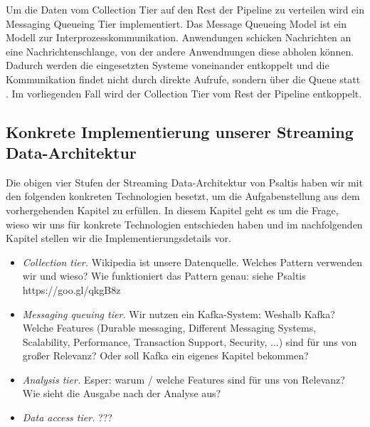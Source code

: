 Um die Daten vom Collection Tier auf den Rest der Pipeline zu verteilen wird ein Messaging Queueing Tier implementiert.
Das Message Queueing Model ist ein Modell zur Interprozesskommunikation. Anwendungen schicken
Nachrichten an eine Nachrichtenschlange, von der andere Anwendnungen diese abholen können\cite{gray2003interprocess}.
Dadurch werden die eingesetzten Systeme voneinander entkoppelt und die Kommunikation findet nicht durch direkte Aufrufe,
sondern über die Queue statt \cite{psaltis2017streaming}. Im vorliegenden Fall wird der Collection Tier vom Rest der Pipeline entkoppelt.


\subsection{Konkrete Implementierung unserer Streaming Data-Architektur}
Die obigen vier Stufen der Streaming Data-Architektur von Psaltis \cite{psaltis2017streaming}
haben wir mit den folgenden konkreten Technologien besetzt, um die Aufgabenstellung aus dem vorhergehenden Kapitel zu erfüllen.
In diesem Kapitel geht es um die Frage, wieso wir uns für konkrete Technologien entschieden haben und im nachfolgenden Kapitel
stellen wir die Implementierungsdetails vor.
\begin{itemize}
    \item \textit{Collection tier.} Wikipedia ist unsere Datenquelle.
    Welches Pattern verwenden wir und wieso? Wie funktioniert das Pattern genau: siehe Psaltis https://goo.gl/qkgB8z
    \item \textit{Messaging queuing tier.} Wir nutzen ein Kafka-System: Weshalb Kafka? Welche Features
    (Durable messaging, Different Messaging Systems, Scalability, Performance, Transaction Support, Security, ...) sind für uns von großer Relevanz?
    Oder soll Kafka ein eigenes Kapitel bekommen?
    \item \textit{Analysis tier.} Esper: warum / welche Features sind für uns von Relevanz? Wie sieht die Ausgabe nach der Analyse aus?
    \item \textit{Data access tier.} ???
\end{itemize}